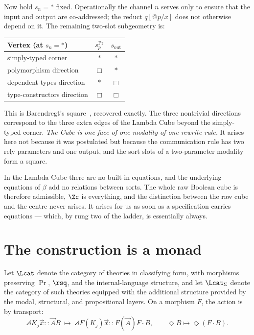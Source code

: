 Now hold $s_n = \ast$ fixed. Operationally the channel $n$ serves only to ensure that the
input and output are co-addressed; the reduct $q[@p/x]$ does not otherwise depend on it.
The remaining two-slot subgeometry is:

\begin{center}
\begin{tabular}{@{}lcc@{}}
\toprule
\textbf{Vertex (at $s_n = \ast$)} & $s_p^{\Pr}$ & $s_{\mathrm{out}}$ \\
\midrule
simply-typed corner        & $\ast$ & $\ast$ \\
polymorphism direction     & $\Box$ & $\ast$ \\
dependent-types direction  & $\ast$ & $\Box$ \\
type-constructors direction& $\Box$ & $\Box$ \\
\bottomrule
\end{tabular}
\end{center}

This is Barendregt's square~\cite{Barendregt1991}, recovered exactly. The three nontrivial
directions correspond to the three extra edges of the Lambda Cube beyond the simply-typed
corner. \emph{The Cube is one face of one modality of one rewrite rule.} It arises here
not because it was postulated but because the communication rule has two rely parameters
and one output, and the sort slots of a two-parameter modality form a square.

\begin{remark}
In the Lambda Cube there are no built-in equations, and the underlying equations of
$\beta$ add no relations between sorts. The whole raw Boolean cube is therefore
admissible, $\Zc$ is everything, and the distinction between the raw cube and the centre
never arises. It arises for us as soon as a specification carries equations --- which, by
rung two of the ladder, is essentially always.
\end{remark}

\section{The construction is a monad}

Let $\Lcat$ denote the category of theories in classifying form, with morphisms preserving
$\Pr$, $\rsq$, and the internal-language structure, and let $\Lcat_\Sigma$ denote the
category of such theories equipped with the additional structure provided by the modal,
structural, and propositional layers. On a morphism $F$, the action is by transport:
\[
  \angles{K_j}{\vec x :: \vec A}{B} \ \longmapsto\
  \angles{F(K_j)}{\vec x :: F(\vec A)}{F \cdot B} ,
  \qquad \Diamond B \longmapsto \Diamond (F \cdot B) .
\]

